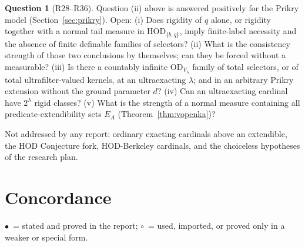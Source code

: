 \documentclass[11pt,letterpaper]{article}
\theoremstyle{definition}
\newtheorem{question}[definition]{Question}
\numberwithin{equation}{section}
\newcommand{\HOD}{\mathrm{HOD}}
\newcommand{\OD}{\mathrm{OD}}
\newcommand{\R}[1]{\textsf{R#1}}
\newcommand{\yes}{$\bullet$}
\newcommand{\prt}{$\circ$}
\begin{document}
\begin{question}[\R{28}--\R{36}]
Question (ii) above is answered positively for the Prikry model (Section~\ref{sec:prikry}). Open: (i) Does rigidity of $q$ alone, or rigidity together with a normal tail measure in $\HOD_{\{b,q\}}$, imply finite-label necessity and the absence of finite definable families of selectors? (ii) What is the consistency strength of those two conclusions by themselves; can they be forced without a measurable? (iii) Is there a countably infinite $\OD_{V_\lambda}$ family of total selectors, or of total ultrafilter-valued kernels, at an ultraexacting $\lambda$; and in an arbitrary Prikry extension without the ground parameter $d$? (iv) Can an ultraexacting cardinal have $2^\lambda$ rigid classes? (v) What is the strength of a normal measure containing all predicate-extendibility sets $E_A$ (Theorem~\ref{thm:vopenka})?
\end{question}

Not addressed by any report: ordinary exacting cardinals above an extendible, the HOD Conjecture fork, HOD-Berkeley cardinals, and the choiceless hypotheses of the research plan.

\appendix
\section{Concordance}\label{app:concordance}

\yes\ = stated and proved in the report; \prt\ = used, imported, or proved only in a weaker or special form.
\end{document}
